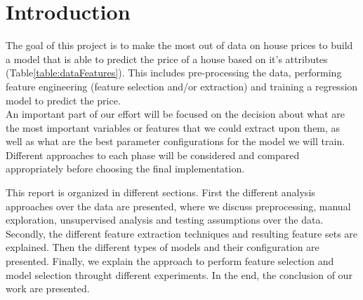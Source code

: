 
\section{Introduction}

The goal of this project is to make the most out of data on house prices to build a model that is able to predict the price of a house based on it's attributes (Table\ref{table:dataFeatures}).
This includes pre-processing the data, performing feature engineering (feature selection and/or extraction) and training a regression model to predict the price. \\
An important part of our effort will be focused on the decision about what are the most important variables or features that we could extract upon them, as well as what are the best parameter configurations for the model we will train. Different approaches to each phase will be considered and compared appropriately before choosing the final implementation.

This report is organized in different sections. First the different analysis approaches over the data are presented, where we discuss preprocessing, manual exploration, unsupervised analysis and testing assumptions over the data. Secondly, the different feature extraction techniques and resulting feature sets are explained. Then the different types of models and their configuration are presented. Finally, we explain the approach to perform feature selection and model selection throught different experiments. In the end, the conclusion of our work are presented.



